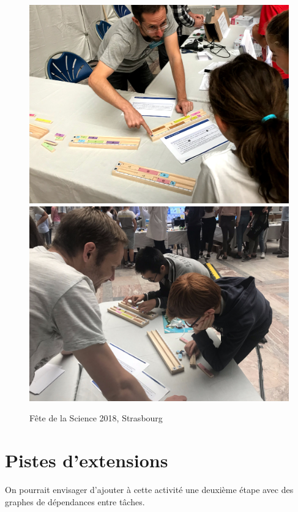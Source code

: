 \documentclass[a4paper]{article}
\begin{document}
\begin{figure}[h!]
\includegraphics[width=\textwidth]{photo_activite.jpg}
\includegraphics[width=\textwidth]{photo_activite2.jpg}

\caption{Fête de la Science 2018, Strasbourg}
\end{figure}

\section{Pistes d'extensions}

On pourrait envisager d'ajouter à cette activité une deuxième étape avec des graphes de dépendances entre tâches.







\clearpage

 

\end{document}
